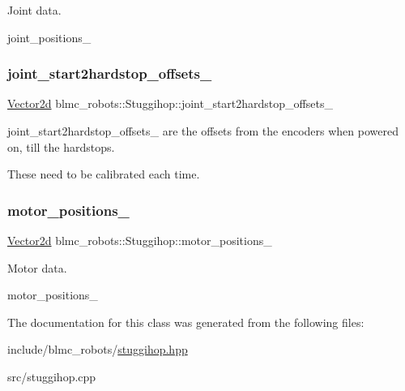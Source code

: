 Joint data. 

joint\+\_\+positions\+\_\+ \mbox{\label{classblmc__robots_1_1Stuggihop_a63813a55789c75aa4e4c7d1c783c857d}} 
\subsubsection{\texorpdfstring{joint\+\_\+start2hardstop\+\_\+offsets\+\_\+}{joint\_start2hardstop\_offsets\_}}
{\footnotesize\ttfamily \hyperlink{common__header_8hpp_acb6916bc8c9fe9d98c484fd4cc201447}{Vector2d} blmc\+\_\+robots\+::\+Stuggihop\+::joint\+\_\+start2hardstop\+\_\+offsets\+\_\+\hspace{0.3cm}{\ttfamily [private]}}



joint\+\_\+start2hardstop\+\_\+offsets\+\_\+ are the offsets from the encoders when powered on, till the hardstops. 

These need to be calibrated each time. \mbox{\label{classblmc__robots_1_1Stuggihop_af452a5e831409fd2c39fd9ab7a42d9c8}} 
\subsubsection{\texorpdfstring{motor\+\_\+positions\+\_\+}{motor\_positions\_}}
{\footnotesize\ttfamily \hyperlink{common__header_8hpp_acb6916bc8c9fe9d98c484fd4cc201447}{Vector2d} blmc\+\_\+robots\+::\+Stuggihop\+::motor\+\_\+positions\+\_\+\hspace{0.3cm}{\ttfamily [private]}}



Motor data. 

motor\+\_\+positions\+\_\+ 

The documentation for this class was generated from the following files\+:\begin{DoxyCompactItemize}
\item 
include/blmc\+\_\+robots/\hyperlink{stuggihop_8hpp}{stuggihop.\+hpp}\item 
src/stuggihop.\+cpp\end{DoxyCompactItemize}
